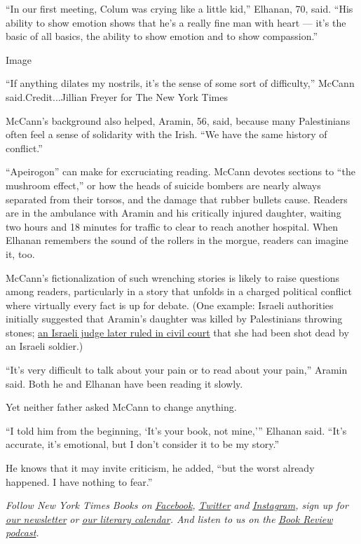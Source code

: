 ``In our first meeting, Colum was crying like a little kid,'' Elhanan,
70, said. ``His ability to show emotion shows that he's a really fine
man with heart --- it's the basic of all basics, the ability to show
emotion and to show compassion.''

Image

``If anything dilates my nostrils, it's the sense of some sort of
difficulty,'' McCann said.Credit...Jillian Freyer for The New York Times

McCann's background also helped, Aramin, 56, said, because many
Palestinians often feel a sense of solidarity with the Irish. ``We have
the same history of conflict.''

``Apeirogon'' can make for excruciating reading. McCann devotes sections
to ``the mushroom effect,'' or how the heads of suicide bombers are
nearly always separated from their torsos, and the damage that rubber
bullets cause. Readers are in the ambulance with Aramin and his
critically injured daughter, waiting two hours and 18 minutes for
traffic to clear to reach another hospital. When Elhanan remembers the
sound of the rollers in the morgue, readers can imagine it, too.

McCann's fictionalization of such wrenching stories is likely to raise
questions among readers, particularly in a story that unfolds in a
charged political conflict where virtually every fact is up for debate.
(One example: Israeli authorities initially suggested that Aramin's
daughter was killed by Palestinians throwing stones;
\href{https://www.theguardian.com/world/2011/sep/26/israel-pay-family-compensation-palestinian-girl}{an
Israeli judge later ruled in civil court} that she had been shot dead by
an Israeli soldier.)

``It's very difficult to talk about your pain or to read about your
pain,'' Aramin said. Both he and Elhanan have been reading it slowly.

Yet neither father asked McCann to change anything.

``I told him from the beginning, `It's your book, not mine,''' Elhanan
said. ``It's accurate, it's emotional, but I don't consider it to be my
story.''

He knows that it may invite criticism, he added, ``but the worst already
happened. I have nothing to fear.''

\emph{Follow New York Times Books on}
\href{https://www.facebookcorewwwi.onion/nytbooks/}{\emph{Facebook}}\emph{,}
\href{https://twitter.com/nytimesbooks}{\emph{Twitter}} \emph{and}
\href{https://www.instagram.com/nytbooks/}{\emph{Instagram}}\emph{, sign
up for}
\href{https://www.nytimes3xbfgragh.onion/newsletters/books-review}{\emph{our
newsletter}} \emph{or}
\href{https://www.nytimes3xbfgragh.onion/interactive/2017/books/books-calendar.html}{\emph{our
literary calendar}}\emph{. And listen to us on the}
\href{https://www.nytimes3xbfgragh.onion/column/book-review-podcast}{\emph{Book
Review podcast}}\emph{.}

